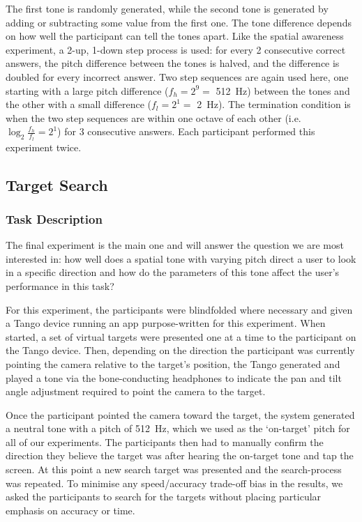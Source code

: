 \documentclass[sigconf, review=true, screen=true, anonymous=true]{acmart}
\begin{document}
The first tone is randomly generated, while the second tone is generated by adding or subtracting some value from the first one.
The tone difference depends on how well the participant can tell the tones apart.
Like the spatial awareness experiment, a 2-up, 1-down step process is used: for every 2 consecutive correct answers, the pitch difference between the tones is halved, and the difference is doubled for every incorrect answer.
Two step sequences are again used here, one starting with a large pitch difference ($f_h=2^9=$ \SI{512}{\hertz}) between the tones and the other with a small difference ($f_l=2^1=$ \SI{2}{\hertz}).
The termination condition is when the two step sequences are within one octave of each other (i.e.\ $\log_2\frac{f_h}{f_l}=2^1$) for 3 consecutive answers.
Each participant performed this experiment twice. 

\subsection{Target Search}

\subsubsection{Task Description}

The final experiment is the main one and will answer the question we are most interested in: how well does a spatial tone with varying pitch direct a user to look in a specific direction and how do the parameters of this tone affect the user's performance in this task? 

For this experiment, the participants were blindfolded where necessary and given a Tango device running an app purpose-written for this experiment.
When started, a set of virtual targets were presented one at a time to the participant on the Tango device.
Then, depending on the direction the participant was currently pointing the camera relative to the target's position, the Tango generated and played a tone via the bone-conducting headphones to indicate the pan and tilt angle adjustment required to point the camera to the target. %

Once the participant pointed the camera toward the target, the system generated a neutral tone with a pitch of \SI{512}{\hertz}, which we used as the `on-target' pitch for all of our experiments.
The participants then had to manually confirm the direction they believe the target was after hearing the on-target tone and tap the screen.
At this point a new search target was presented and the search-process was repeated.
To minimise any speed/accuracy trade-off bias in the results, we asked the participants to search for the targets without placing particular emphasis on accuracy or time. 
\end{document}
